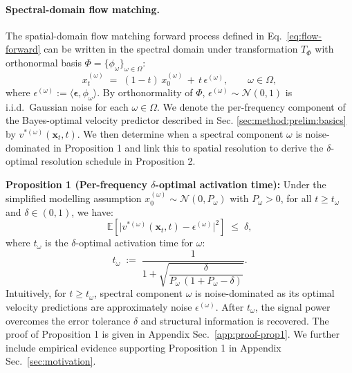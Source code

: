 
\paragraph{Spectral-domain flow matching.}
The spatial-domain flow matching forward process defined in Eq.~\eqref{eq:flow-forward} can be written in the spectral domain under transformation $T_\Phi$ with orthonormal basis $\Phi = \{\phi_\omega\}_{\omega \in \Omega}$:
\begin{equation}
  x_t^{(\omega)} \;=\; (1-t)\,x_0^{(\omega)} \,+\, t\,\epsilon^{(\omega)},
  \qquad \omega \in \Omega,
  \label{eq:forward-mode}
\end{equation}
where $\epsilon^{(\omega)} := \langle \boldsymbol{\epsilon}, \phi_\omega \rangle$. By orthonormality of $\Phi$, $\epsilon^{(\omega)} \sim \mathcal{N}(0, 1)$ is i.i.d.\ Gaussian noise for each $\omega \in \Omega$. We denote the per-frequency component of the Bayes-optimal velocity predictor described in Sec. \ref{sec:method:prelim:basics} by $v^{*(\omega)}(\mathbf{x}_t, t)$. We then determine when a spectral component $\omega$ is noise-dominated in Proposition 1 and link this to spatial resolution to derive the $\delta$-optimal resolution schedule in Proposition 2. 


\textbf{Proposition 1 (Per-frequency $\delta$-optimal activation time):} Under the simplified modelling assumption $x_0^{(\omega)} \sim \mathcal{N}(0, P_\omega)$ with $P_\omega > 0$, for all $t \ge t_\omega$ and $\delta\in(0, 1)$, we have:
\begin{equation}
  \mathbb{E}\!\left[\bigl|v^{*(\omega)}(\mathbf{x}_t, t) - \epsilon^{(\omega)}\bigr|^2\right] \;\le\; \delta,
  \label{eq:noise-dominated}
\end{equation}
where $t_\omega$ is the $\delta$-optimal activation time for $\omega$:
\begin{equation}
  t_\omega \;:=\; \frac{1}{1 + \sqrt{\dfrac{\delta}{P_\omega\,(1 + P_\omega - \delta)}}}.
  \label{eq:activation}
\end{equation}
Intuitively, for $t \geq t_\omega$, spectral component $\omega$ is noise-dominated as its optimal velocity predictions are approximately noise $\epsilon^{(\omega)}$. After $t_\omega$, the signal power overcomes the error tolerance $\delta$ and structural information is recovered. The proof of Proposition 1 is given in Appendix Sec.~\ref{app:proof-prop1}. We further include empirical evidence supporting Proposition 1 in Appendix Sec.~\ref{sec:motivation}.


